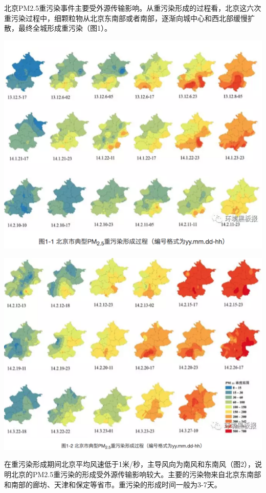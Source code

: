 \documentclass[]{book}
\begin{document}
北京PM2.5重污染事件主要受外源传输影响。从重污染形成的过程看，北京这六次重污染过程中，细颗粒物从北京东南部或者南部，逐渐向城中心和西北部缓慢扩散，最终全城形成重污染（图1）。

\includegraphics[width=8.33in]{images/windhaze1}

\includegraphics[width=8.33in]{images/windhaze2}

在重污染形成期间北京平均风速低于1米/秒，主导风向为南风和东南风（图2），说明北京的PM2.5重污染的形成受外源传输影响较大。主要的污染物来自北京东南部和南部的廊坊、天津和保定等省市。重污染的形成时间一般为3-7天。
\end{document}
